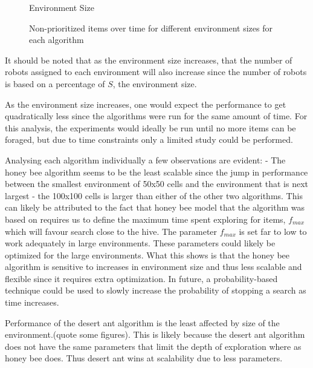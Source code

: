 \begin{figure}[!htb]
\centering
\resizebox{\textwidth}{!}{}
\caption{Environment Size}
\label{sizegoldplot}
\end{figure}

\begin{figure}[!htb]
\centering
\resizebox{\textwidth}{!}{}
\caption{Non-prioritized items over time for different environment sizes for each algorithm}
\label{sizewasteplot}
\end{figure}

It should be noted that as the environment size increases, that the number of robots assigned to each environment will also increase since the number of robots is based on a percentage of $S$, the environment size.


As the environment size increases, one would expect the performance to get quadratically less since the algorithms were run for the same amount of time. For this analysis, the experiments would ideally be run until no more items can be foraged, but due to time constraints only a limited study could be performed. 

Analysing each algorithm individually a few observations are evident:
- The honey bee algorithm seems to be the least scalable since the jump in performance between the smallest environment of 50x50 cells and the environment that is next largest - the 100x100 cells is larger than either of the other two algorithms. This can likely be attributed to the fact that honey bee model that the algorithm was based on requires us to define the maximum time spent exploring for items, $f_{max}$ which will favour search close to the hive. The parameter $f_{max}$ is set far to low to work adequately in large environments. These parameters could likely be optimized for the large environments. What this shows is that the honey bee algorithm is sensitive to increases in environment size and thus less scalable and flexible since it requires extra optimization. In future, a probability-based technique could be used to slowly increase the probability of stopping a search as time increases. 

Performance of the desert ant algorithm is the least affected by size of the environment.(quote some figures). This is likely because the desert ant algorithm does not have the same parameters that limit the depth of exploration where as honey bee does. Thus desert ant wins at scalability due to less parameters. 



